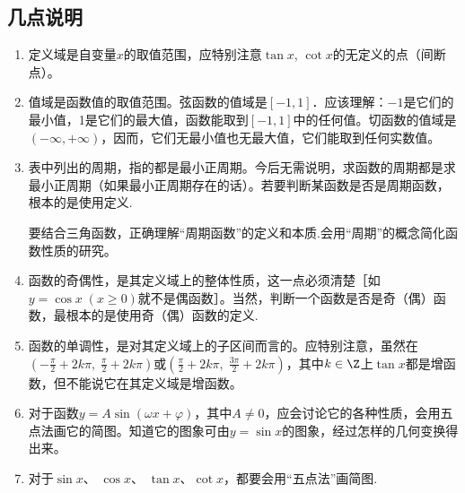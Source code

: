 \subsection{几点说明}
\begin{enumerate}
    \item 定义域是自变量$x$的取值范围，应特别注意$\tan x$, $\cot x$的无定义的点（间断点）。
    \item 值域是函数值的取值范围。弦函数的值域是$[-1,1]$．应该理解：$-1$是它们的最小值，1是它们的最大值，函数能取到$[-1,1]$中的任何值。切函数的值域是$(-\infty,+\infty)$，因而，它们无最小值也无最大值，它们能取到任何实数值。
    \item 表中列出的周期，指的都是最小正周期。今后无需说明，求函数的周期都是求最小正周期（如果最小正周期存在的话）。若要判断某函数是否是周期函数，根本的是使用定义.
    
    要结合三角函数，正确理解“周期函数”的定义和本质.会用“周期”的概念简化函数性质的研究。
    \item 函数的奇偶性，是其定义域上的整体性质，这一点必须清楚［如$y=\cos x\; (x\ge 0)$就不是偶函数］。当然，判断一个函数是否是奇（偶）函数，最根本的是使用奇（偶）函数的定义.
    \item 函数的单调性，是对其定义域上的子区间而言的。应特别注意，虽然在$\left(-\frac{\pi}{2}+2k\pi,\; \frac{\pi}{2}+2k\pi\right)$或$\left(\frac{\pi}{2}+2k\pi,\; \frac{3\pi}{2}+2k\pi\right)$，其中$k\in\Z$上$\tan x$都是增函数，但不能说它在其定义域是增函数。
    \item  对于函数$y=A\sin(\omega x+\varphi)$，其中$A\ne 0$，应会讨论它的各种性质，会用五点法画它的简图。知道它的图象可由$y=\sin x$的图象，经过怎样的几何变换得出来。
    \item 对于$\sin x$、 $\cos x$、 $\tan x$、$\cot x$，都要会用“五点法”画简图.
\end{enumerate}






\begin{example}
    
\end{example}

\begin{analyze}
    
\end{analyze}

\begin{solution}
    
\end{solution}




